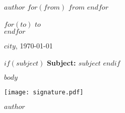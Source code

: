 \documentclass[$fontsize$, a4paper]{article}
\begin{document}
\small
\textsc{\textbf{$author$}}
$for(from)$
\textbullet{} \textsc{$from$}
$endfor$

\vspace{1em}

\normalsize \sffamily
$for(to)$
$to$\\
$endfor$

\vspace{3em}

\rmfamily
\begin{flushright}
  $city$, \today
\end{flushright}

\vspace{1em}

$if(subject)$
\textbf{Subject: $subject$}
$endif$

\vspace{1em}

$body$

\begin{FlushRight}
  \texttt{[image: signature.pdf]} \par 
  $author$
\end{FlushRight}
\end{document}
